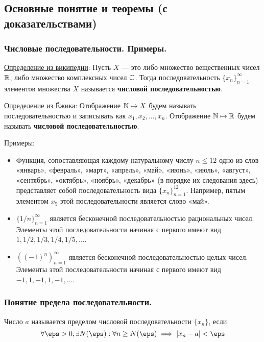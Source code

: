 \documentclass[12pt, a4paper]{article}
\begin{document}
	\subsection{Основные понятие и теоремы (с доказательствами)}
	\subsubsection{Числовые последовательности. Примеры.}
	\underline{Определение из википедии}: Пусть $X$ --- это либо множество вещественных чисел $\mathbb{R}$, либо множество комплексных чисел $\mathbb{C}$. Тогда последовательность $\{x_n\}_{n = 1}^{\infty}$ элементов множества $X$ называется \textbf{числовой последовательностью}.

	\underline{Определение из Ёжика}: Отображение $\mathbb{N} \mapsto X$ будем называть последовательностью и записывать как $x_1, x_2, \dots, x_n$. Отображение $\mathbb{N} \mapsto \mathbb{R}$ будем называть \textbf{числовой последовательностью}.

	Примеры:
	\begin{itemize}
		\item
		Функция, сопоставляющая каждому натуральному числу $n \leq 12$ одно из слов «январь», «февраль», «март», «апрель», «май», «июнь», «июль», «август», «сентябрь», «октябрь», «ноябрь», «декабрь» (в порядке их следования здесь) представляет собой последовательность вида $\{x_n\}_{n=1}^{12}$. Например, пятым элементом $x_5$ этой последовательности является слово «май».

		\item
		$\{1/n\}_{n=1}^{\infty}$ является бесконечной последовательностью рациональных чисел. Элементы этой последовательности начиная с первого имеют вид $1,1/2,1/3,1/4,1/5,\ldots$.

		\item
		$\left((-1)^{n}\right)_{{n=1}}^{{\infty }}$ является бесконечной последовательностью целых чисел. Элементы этой последовательности начиная с первого имеют вид $-1,1,-1,1,-1,\ldots$.
	\end{itemize}

	\subsubsection{Понятие предела последовательности.}
	Число $a$ называется пределом числовой последовательности $\{x_n\}$, если
	\begin{equation*}
		\forall \eps > 0, \exists N(\eps): \forall n \geq N(\eps) \implies |x_n - a| < \eps
	\end{equation*}
\end{document}
